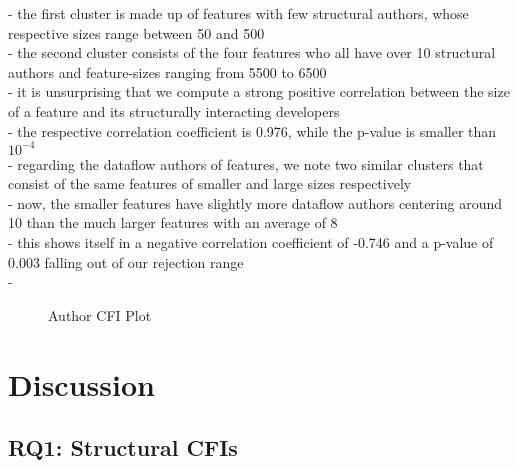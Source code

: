 - the first cluster is made up of features with few structural authors, whose respective sizes range between 50 and 500 \\
- the second cluster consists of the four features who all have over 10 structural authors and feature-sizes ranging from 5500 to 6500 \\
- it is unsurprising that we compute a strong positive correlation between the size of a feature and its structurally interacting developers \\
- the respective correlation coefficient is 0.976, while the p-value is smaller than $10^{-4}$ \\
- regarding the dataflow authors of features, we note two similar clusters that consist of the same features of smaller and large sizes respectively \\
- now, the smaller features have slightly more dataflow authors centering around 10 than the much larger features with an average of 8 \\
- this shows itself in a negative correlation coefficient of -0.746 and a p-value of 0.003 falling out of our rejection range \\
- 
































\begin{figure}[htbp]
  \centering
  
  \caption{Author CFI Plot}
  \label{fig:author_cfi_plot}
\end{figure}

\clearpage 

\section{Discussion}\label{sec:discussion}

\subsection*{\textbf{RQ1: Structural CFIs}}\label{sec:eval_struc_cfis}

